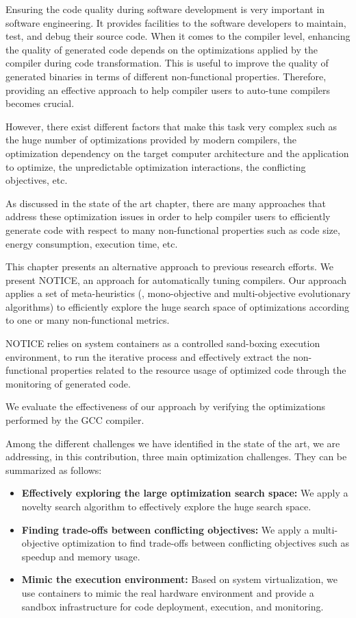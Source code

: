 Ensuring the code quality during software development is very important in software engineering. It provides facilities to the software developers to maintain, test, and debug their source code. 
When it comes to the compiler level, enhancing the quality of generated code depends on the optimizations applied by the compiler during code transformation. This is useful to improve the quality of generated binaries in terms of different non-functional properties. 
Therefore, providing an effective approach to help compiler users to auto-tune compilers becomes crucial.  

However, there exist different factors that make this task very complex such as the huge number of optimizations provided by modern compilers, the optimization dependency on the target computer architecture and the application to optimize, the unpredictable optimization interactions, the conflicting objectives, etc. 

As discussed in the state of the art chapter, there are many approaches that address these optimization issues in order to help compiler users to efficiently generate code with respect to many non-functional properties such as code size, energy consumption, execution time, etc. 
	
This chapter presents an alternative approach to previous research efforts. 
We present NOTICE, an approach for automatically tuning compilers. 
Our approach applies a set of meta-heuristics (\ie, mono-objective and multi-objective evolutionary algorithms) to efficiently explore the huge search space of optimizations according to one or many non-functional metrics.

NOTICE relies on system containers as a controlled sand-boxing execution environment, to run the iterative process and effectively extract the non-functional properties related to the resource usage of optimized code through the monitoring of generated code.
 

We evaluate the effectiveness of our approach by verifying the optimizations performed by the GCC compiler.

Among the different challenges we have identified in the state of the art, we are addressing, in this contribution, three main optimization challenges. They can be summarized as follows: 
\begin{itemize} 
	\item \textbf{Effectively exploring the large optimization search space:} We apply a novelty search algorithm to effectively explore the huge search space.
	\item \textbf{Finding trade-offs between conflicting objectives:} We apply a multi-objective optimization to find trade-offs between conflicting objectives such as speedup and memory usage.
	\item \textbf{Mimic the execution environment:} Based on system virtualization, we use containers to mimic the real hardware environment and provide a sandbox infrastructure for code deployment, execution, and monitoring.
\end{itemize} 
	

